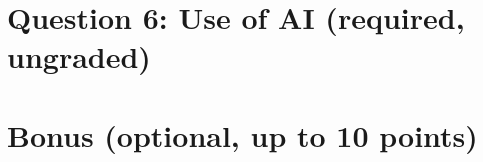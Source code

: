 \documentclass[11pt]{article}
\begin{document}
\section*{Question 6: Use of AI (required, ungraded)}

\section*{Bonus (optional, up to 10 points)}
\end{document}
